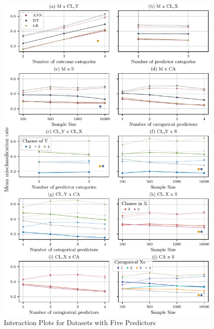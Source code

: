 \documentclass[12pt]{article}
\begin{document}
\begin{figure}[h]
    \centering
    \includegraphics{fig/10_14_Interactions_V5.pdf}
    \caption{Interaction Plots for Datasets with Five Predictors}
    \label{fig:10_14_Interactions_V5}
\end{figure}
\end{document}
